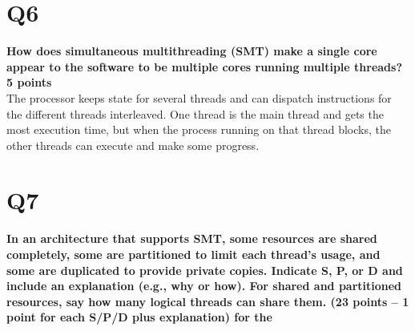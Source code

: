 \documentclass[a4paper]{article}
\begin{document}
\section*{Q6}
\large{\textbf{
How does simultaneous multithreading (SMT) make a single core appear to the software to be multiple cores running multiple threads? 5 points\\}}
The processor keeps state for several threads and can dispatch instructions for the different threads interleaved. One thread is the main thread and gets the most execution time, but when the process running on that thread blocks, the other threads can execute and make some progress.

\section*{Q7}
\large{\textbf{
In an architecture that supports SMT, some resources are shared     completely, some are partitioned to limit each thread’s usage, and     some are duplicated to provide private copies. Indicate S, P, or D     and include an explanation (e.g., why or how). For shared and     partitioned resources, say how many logical threads can share them. (23 points -- 1 point for each S/P/D plus explanation) for the \\}}
\end{document}
